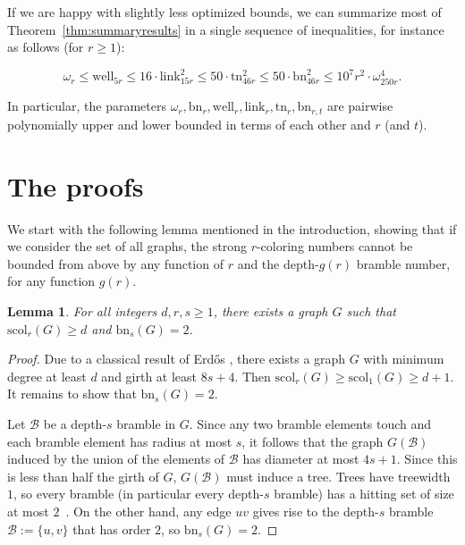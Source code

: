 \documentclass[final]{dmtcs-episciences}
\newtheorem{lem}[thm]{Lemma}
\theoremstyle{definition}
\theoremstyle{remark}
\newcommand{\dep}{depth}
\newcommand{\scol}{\ensuremath{\mathrm{scol}}}
\newcommand{\tangle}{\ensuremath{\mathrm{tn}}}
\newcommand{\bn}{\ensuremath{\mathrm{bn}}}
\newcommand{\link}{\ensuremath{\mathrm{link}}}
\newcommand{\WL}{\ensuremath{\mathrm{well}}}
\renewcommand{\leq}{\leqslant}
\renewcommand{\ge}{\geqslant}
\renewcommand{\geq}{\geqslant}
\begin{document}
If we are happy with slightly less optimized bounds, we can summarize most of Theorem~\ref{thm:summaryresults} in a single sequence of inequalities, for instance as follows (for $r\geq 1$):

$$\omega_r \leq \WL_{5r} \leq 16 \cdot \link_{15r}^2 \leq 50 \cdot \tangle_{46r}^2 \leq 50 \cdot \bn_{46r}^2 \leq 10^7 r^2 \cdot \omega_{250 r}^4 .$$


In particular, the parameters $\omega_r, \bn_r, \WL_r, \link_r, \tangle_r, \bn_{r,t}$ are pairwise polynomially upper and lower bounded in terms of each other and $r$ (and $t$). 


\section{The proofs}\label{sec:proof}

We start with the following lemma mentioned in the introduction, showing that if we consider the set of all graphs,
the strong $r$-coloring numbers cannot be bounded from above by any function of $r$ and the \dep-$g(r)$ bramble number, for any function $g(r)$. 

\begin{lem}\label{lem:counterexample}
For all integers $d,r,s \ge 1$, there exists a graph $G$ such that $\scol_r(G) \geq d$ and $\bn_s(G)=2$.
\end{lem}
\begin{proof}
Due to a classical result of Erd\H{o}s  \cite{Erd59}, there exists a graph $G$ with minimum degree at least $d$ and girth at least $8s+4$. Then $\scol_r(G) \geq \scol_1(G) \geq d+1$. 
It remains to show that $\bn_{s}(G)=2$. 

Let $\mathcal{B}$ be a \dep-$s$ bramble in $G$. 
Since any two bramble elements touch and each bramble element has radius at most $s$,
it follows that the graph $G(\mathcal{B})$ induced by the union of the elements of $\mathcal{B}$ has diameter at most $4s+1$. Since this is less than half the girth of $G$, $G(\mathcal{B})$ must induce a tree. Trees have treewidth $1$, so every bramble (in particular every \dep-$s$ bramble) has a hitting set of size at most $2$~\cite{ST1993}. On the other hand, any edge $uv$ gives rise to the \dep-$s$ bramble $\mathcal{B}:=\{u,v\}$ that has order $2$, so $\bn_{s}(G)=2$. 
\end{proof}
\end{document}
